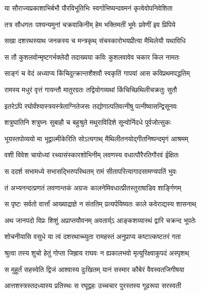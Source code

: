 \twolineshloka
{या सौराज्यप्रकाशाभिर्बभौ पौरविभूतिभिः}
{स्वर्गाभिष्यन्दवमनं कृत्वेवोपनिवेशिता}%

\twolineshloka
{तत्र सौधगतः पश्यन्यमुनां चक्रवाकिनीम्}
{हेम भक्तिमतीं भूमेः प्रवेणीं इव प्रिपिये}%

\twolineshloka
{सखा दशरथस्याथ जनकस्य च मन्त्रकृथ्}
{संचस्कारोभयप्रीत्या मैथिलेयौ यथाविधि}%

\twolineshloka
{स तौ कुशलवोन्मृष्टगर्भक्लेदौ तदाख्यया}
{कविः कुशलवावेव चकार किल नामतः}%

\twolineshloka
{साङ्गं च वेदं अध्याप्य किंचिदुत्क्रान्तशैशवौ}
{स्वकृतिं गापयां आस कविप्रथमपद्धतिम्}%

\twolineshloka
{रामस्य मधुरं वृत्तं गायन्तौ मातुरग्रतः}
{तद्वियोगव्यथां किंचिच्छिथिलीचक्रतुः सुतौ}%

\twolineshloka
{इतरेऽपि रघोर्वंश्यास्त्रयस्त्रेताग्नितेजसः}
{तद्योगात्पतिवत्नीषु पत्नीष्वासन्द्विसूनवः}%

\twolineshloka
{शत्रुघातिनि शत्रुघ्नः सुबाहौ च बहुश्रुते}
{मथुराविदिशे सून्वोर्निदधे पूर्वजोत्सुकः}%

\twolineshloka
{भूयस्तपोव्ययो मा भूद्वाल्मीकेरिति सोऽत्यगाथ्}
{मैथिलीतनयोद्गीतनिष्पन्दमृगं आश्रमम्}%

\twolineshloka
{वशी विवेश चायोध्यां रथ्यासंस्कारशोभिनीम्}
{लवणस्य वधात्पौरैरतिगौरवं ईक्षितः}%

\twolineshloka
{स ददर्श सभामध्ये सभासद्भिरुपस्थितम्}
{रामं सीतापरित्यागादसामण्यपतिं भुवः}%

\twolineshloka
{तं अभ्यनन्दत्प्रणतं लवणान्तकं अग्रजः}
{कालनेमिवधात्प्रीतस्तुराषाडिव शार्ङ्गिणम्}%

\twolineshloka
{स पृष्टः सर्वतो वार्त्तां आख्याद्राज्ञे न संततिम्}
{प्रत्यर्पयिष्यतः काले कवेराद्यस्य शासनाथ्}%

\twolineshloka
{अथ जानपदो विप्रः शिशुं अप्राप्तयौवनम्}
{अवतार्य्ऽ आङ्कशय्यास्थं द्वारि चक्रन्द भूपतेः}%

\twolineshloka
{शोचनीयासि वसुधे या त्वं दशरथाच्च्युता}
{रामहस्तं अनुप्राप्य कष्टात्कष्टतरं गता}%

\twolineshloka
{श्रुत्वा तस्य शुचो हेतुं गोप्ता जिह्राय राघवः}
{न ह्यकालभवो मृत्युरिक्ष्वाकुपदं अस्पृशथ्}%

\twolineshloka
{स मुहूर्तं सहस्वेति द्विजं आश्वास्य दुःखितम्}
{यानं सस्मार कौबेरं वैवस्वतजिगीषया}%

\twolineshloka
{आत्तशस्त्रस्तदध्यास्य प्रतिस्थः स रघूद्वहः}
{उच्चचार पुरस्तस्य गूढरूपा सरस्वती}%

